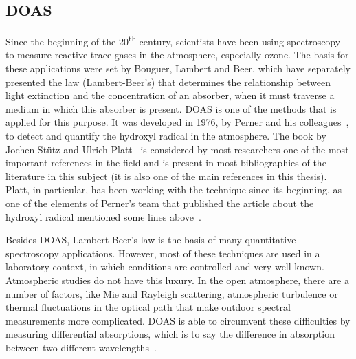 \subsection{\gls{DOAS}}%
\label{sub:doas}

Since the beginning of the 20\textsuperscript{th} century, scientists
have been using spectroscopy to measure reactive trace gases in the
atmosphere, especially ozone. The basis for these applications were set
by Bouguer, Lambert and Beer, which have separately presented the law
(Lambert-Beer's) that determines the relationship between light
extinction and the concentration of an absorber, when it must traverse a
medium in which this absorber is present. \gls{DOAS} is one of the
methods that is applied for this purpose. It was developed in 1976, by
Perner and his colleagues~\cite{Perner1976}, to detect and quantify the
hydroxyl radical in the atmosphere. The book by Jochen Stütz and Ulrich
Platt~\cite{Platt2007} is considered by most researchers one of the most
important references in the field and is present in most bibliographies
of the literature in this subject (it is also one of the main references
in this thesis). Platt, in particular, has been working with the
technique since its beginning, as one of the elements of Perner's team
that published the article about the hydroxyl radical mentioned some
lines above~\cite{Perner1976}.

Besides \gls{DOAS}, Lambert-Beer's law is the basis of many quantitative
spectroscopy applications. However, most of these techniques are used in
a laboratory context, in which conditions are controlled and very well
known. Atmospheric studies do not have this luxury. In the open
atmosphere, there are a number of factors, like Mie and Rayleigh
scattering, atmospheric turbulence or thermal fluctuations in the
optical path that make outdoor spectral measurements more complicated.
\gls{DOAS} is able to circumvent these difficulties by measuring
differential absorptions, which is to say the difference in absorption
between two different wavelengths~\cite{Platt2007, Merlaud2013}.

